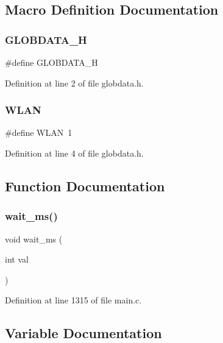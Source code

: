 \subsection{Macro Definition Documentation}
\mbox{\label{globdata_8h_aeeef5de8dc8f785414a6c7a47d53c2d7}} 
\subsubsection{G\+L\+O\+B\+D\+A\+T\+A\+\_\+H}
{\footnotesize\ttfamily \#define G\+L\+O\+B\+D\+A\+T\+A\+\_\+H}



Definition at line 2 of file globdata.\+h.

\mbox{\label{globdata_8h_ad64e0a093cb3ac48bff71557197b1ee2}} 
\subsubsection{W\+L\+AN}
{\footnotesize\ttfamily \#define W\+L\+AN~1}



Definition at line 4 of file globdata.\+h.



\subsection{Function Documentation}
\mbox{\label{globdata_8h_a673e7c8d7d59846090268d3eb6261697}} 
\subsubsection{wait\+\_\+ms()}
{\footnotesize\ttfamily void wait\+\_\+ms (\begin{DoxyParamCaption}\item[{int}]{val }\end{DoxyParamCaption})}



Definition at line 1315 of file main.\+c.



\subsection{Variable Documentation}
\mbox{\label{globdata_8h_add5c5c9cbf8e60eecea9081015cd6a80}} 
